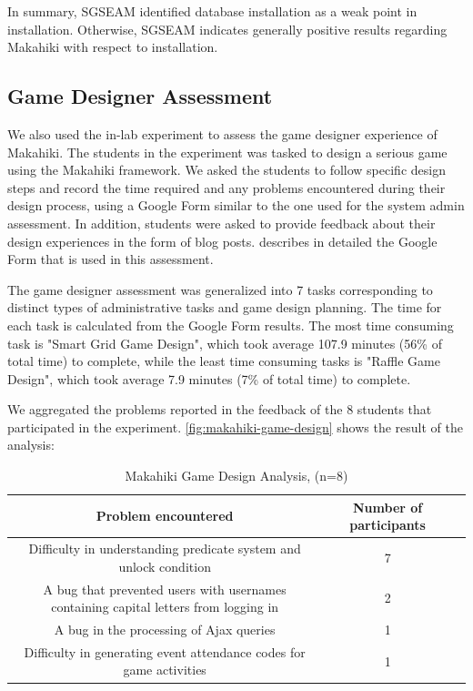 \documentclass{sigchi}
\newcommand\tabhead[1]{\small\textbf{#1}}
\begin{document}
In summary, SGSEAM identified database installation as a weak point in
installation.  Otherwise, SGSEAM indicates generally positive results regarding
Makahiki with respect to installation. 

\subsection{Game Designer Assessment}

We also used the in-lab experiment to assess the game
designer experience of Makahiki. The students in the
experiment was tasked to design a serious game using the Makahiki framework. We asked the students
to follow specific design steps and record the time required and any problems encountered during
their design process, using a Google Form similar to the one used for the system admin
assessment. In addition, students were asked to provide feedback about their
design experiences in the form of blog posts. \cite{csdl2-13-04} describes in detailed
the Google Form that is used in this assessment.

The game designer assessment was generalized into 7 tasks corresponding to
distinct types of administrative tasks and game design planning. The time for each task is
calculated from the Google Form results.  The most time consuming task
 is "Smart Grid Game Design", which took average 107.9 minutes (56\% of total time) to complete,
 while the least time
  consuming tasks is "Raffle Game Design", which took average 7.9 minutes (7\% of total time)
  to complete.

 We aggregated the problems reported in the feedback of the 8 students that participated in the experiment.
\autoref{fig:makahiki-game-design} shows the result of the analysis:

\begin{table}
  \centering
  \begin{tabular}{|c|c|c|}
    \hline
    \multicolumn{1}{|p{0.7\columnwidth}|}{\centering\tabhead{Problem encountered}} &
    \multicolumn{1}{|p{0.2\columnwidth}|}{\centering\tabhead{Number of participants}} \\
    \hline
    \multicolumn{1}{|p{0.7\columnwidth}|}{Difficulty in understanding predicate system and unlock condition} &
    \multicolumn{1}{|p{0.2\columnwidth}|}{7} \\
    \hline
    \multicolumn{1}{|p{0.7\columnwidth}|}{A bug that prevented users with usernames
containing capital letters from logging in} &
    \multicolumn{1}{|p{0.2\columnwidth}|}{2} \\
    \hline
    \multicolumn{1}{|p{0.7\columnwidth}|}{A bug in the processing of Ajax queries} &
    \multicolumn{1}{|p{0.2\columnwidth}|}{1} \\
    \hline
    \multicolumn{1}{|p{0.7\columnwidth}|}{Difficulty in generating event attendance codes for game activities} &
    \multicolumn{1}{|p{0.2\columnwidth}|}{1} \\
    \hline
  \end{tabular}
  \caption{Makahiki Game Design Analysis, (n=8)}
  \label{fig:makahiki-game-design}
\end{table}
\end{document}
